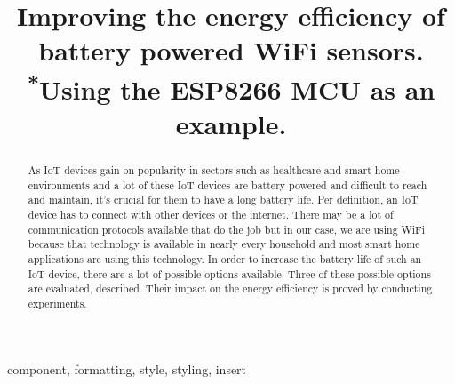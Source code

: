 \documentclass[conference]{IEEEtran}
\begin{document}
\title{Improving the energy efficiency of battery powered WiFi sensors.\\
{\footnotesize \textsuperscript{*}Using the ESP8266 MCU as an example.}
}

\author{
\and
{}
\and
{}
}

\maketitle

\begin{abstract}
As IoT devices gain on popularity in sectors such as healthcare and smart home environments and a lot of these IoT devices are battery powered and difficult to reach and maintain, it's crucial for them to have a long battery life.
Per definition, an IoT device has to connect with other devices or the internet. 
There may be a lot of communication protocols available that do the job but in our case, we are using WiFi because that technology is available in nearly every household and most smart home applications are using this technology.
In order to increase the battery life of such an IoT device, there are a lot of possible options available.
Three of these possible options are evaluated, described. Their impact on the energy efficiency is proved by conducting experiments.


\end{abstract}

\begin{IEEEkeywords}
component, formatting, style, styling, insert
\end{IEEEkeywords}
\end{document}
